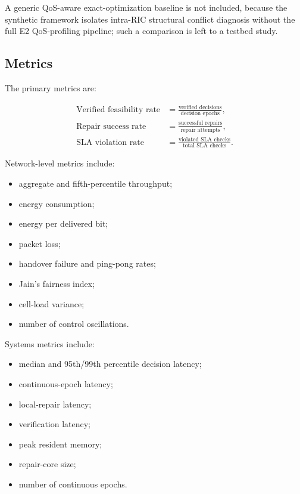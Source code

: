 \documentclass[pdflatex,sn-mathphys-num,iicol,oneside]{sn-jnl}
\begin{document}
A generic QoS-aware exact-optimization baseline is not included, because
the synthetic framework isolates intra-RIC structural conflict diagnosis
without the full E2 QoS-profiling pipeline; such a comparison is left to a
testbed study.

\subsection{Metrics}

The primary metrics are:

\begin{align}
\text{Verified feasibility rate}
&=
\frac{\text{verified decisions}}
{\text{decision epochs}},
\\
\text{Repair success rate}
&=
\frac{\text{successful repairs}}
{\text{repair attempts}},
\\
\text{SLA violation rate}
&=
\frac{\text{violated SLA checks}}
{\text{total SLA checks}}.
\end{align}

Network-level metrics include:

\begin{itemize}
    \item aggregate and fifth-percentile throughput;
    \item energy consumption;
    \item energy per delivered bit;
    \item packet loss;
    \item handover failure and ping-pong rates;
    \item Jain's fairness index;
    \item cell-load variance;
    \item number of control oscillations.
\end{itemize}

Systems metrics include:

\begin{itemize}
    \item median and 95th/99th percentile decision latency;
    \item continuous-epoch latency;
    \item local-repair latency;
    \item verification latency;
    \item peak resident memory;
    \item repair-core size;
    \item number of continuous epochs.
\end{itemize}
\end{document}
